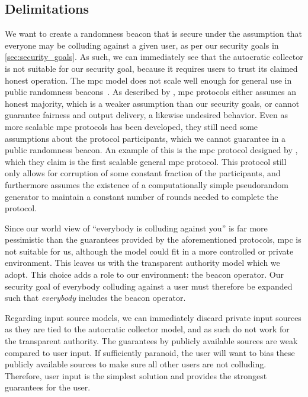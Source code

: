 \subsection{Delimitations}%
\label{sub:delimitations}
We want to create a randomness beacon that is secure under the assumption that everyone may be colluding against a given user, as per our security goals in \cref{sec:security_goals}.
As such, we can immediately see that the autocratic collector is not suitable for our security goal, because it requires users to trust its claimed honest operation.
The \gls{mpc} model does not scale well enough for general use in public randomness beacons~\cite{syta2017scalable}.
As described by \citet{damgaard2006scalable}, \gls{mpc} protocols either assumes an honest majority, which is a weaker assumption than our security goals, or cannot guarantee fairness and output delivery, a likewise undesired behavior.
Even as more scalable \gls{mpc} protocols has been developed, they still need some assumptions about the protocol participants, which we cannot guarantee in a public randomness beacon.
An example of this is the \gls{mpc} protocol designed by \citet{damgaard2006scalable}, which they claim is the first scalable general \gls{mpc} protocol.
This protocol still only allows for corruption of some constant fraction of the participants, and furthermore assumes the existence of a computationally simple pseudorandom generator to maintain a constant number of rounds needed to complete the protocol.

Since our world view of \enquote{everybody is colluding against you} is far more pessimistic than the guarantees provided by the aforementioned protocols, \gls{mpc} is not suitable for us, although the model could fit in a more controlled or private environment.
This leaves us with the transparent authority model which we adopt.
This choice adds a role to our environment: the beacon operator. Our security goal of everybody colluding against a user must therefore be expanded such that \emph{everybody} includes the beacon operator.

Regarding input source models, we can immediately discard private input sources as they are tied to the autocratic collector model, and as such do not work for the transparent authority.
The guarantees by publicly available sources are weak compared to user input.
If sufficiently paranoid, the user will want to bias these publicly available sources to make sure all other users are not colluding.
Therefore, user input is the simplest solution and provides the strongest guarantees for the user.
